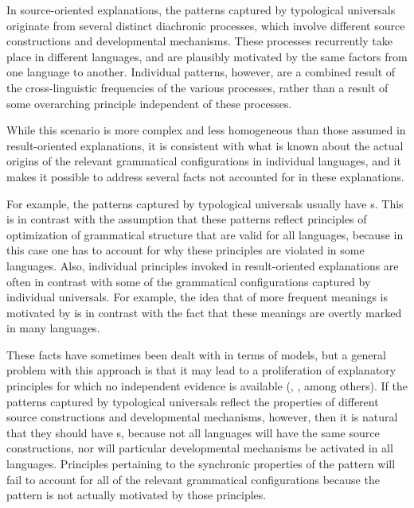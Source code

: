 \documentclass[output=paper]{langsci/langscibook}
\begin{document}
In 
\label{p:cristofaro:strands}
source-oriented explanations,  the patterns
captured by typological universals originate from several distinct diachronic processes, which involve
different source constructions and developmental mechanisms. 
These
processes recurrently take place in different languages, and are
plausibly motivated by the same factors from one language to another. Individual patterns, however, are a combined
result of the cross-linguistic frequencies of the various processes, rather than a result
of some 
overarching principle independent of these processes.

While
this scenario is 
more complex and less homogeneous than those assumed in result-oriented explanations, it is consistent with what is known about the actual origins of
the relevant grammatical configurations in individual languages, and it
makes it possible to address several facts  not accounted for in
these explanations. 

For example, the patterns captured by typological universals usually
have s. This is
in contrast with the assumption that these patterns reflect principles of optimization of
grammatical structure that are valid for all languages, because in
this case one has to account for why these principles are violated in
some languages. Also, individual principles invoked in result-oriented
explanations are often in contrast with some of the
grammatical configurations captured by individual universals. For
example, the idea that  of more frequent meanings is
motivated by  is in contrast with the fact that these meanings
are overtly marked in many languages. 

These facts have sometimes been
dealt with in terms of  models, but a general
problem with this approach is that it may lead to a
proliferation of explanatory principles for which no independent
evidence is available (, \citealt{Otacompetingmotivations}, among
others). If the patterns captured by typological universals reflect the properties of different
source constructions and developmental mechanisms, however, then 
\label{p:cristofaro:commonalitiesexceptions}
it is
natural that they should have s, because not all
languages will have the same source constructions, nor will
particular developmental mechanisms be activated in all
languages. Principles pertaining to the synchronic properties of the
pattern will fail to account for all of the relevant grammatical
configurations because the pattern is not actually motivated by those principles.
\end{document}
